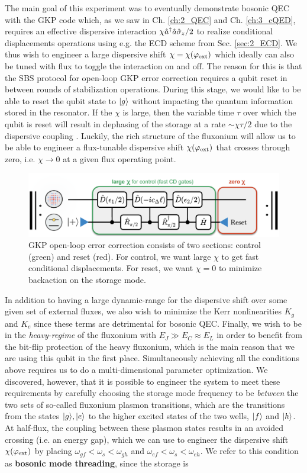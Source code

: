 The main goal of this experiment was to eventually demonstrate bosonic QEC with the GKP code which, as we saw in Ch. \ref{ch:2_QEC} and Ch. \ref{ch:3_cQED}, requires an effective dispersive interaction $\chi\hat{a}^\dagger\hat{a}\hat{\sigma}_z/2$ to realize conditional displacements operations using e.g. the ECD scheme from Sec. \ref{sec:2_ECD}. We thus wish to engineer a large dispersive shift $\chi = \chi(\varphi_{\rm ext})$ which ideally can also be tuned with flux to toggle the interaction on and off. The reason for this is that the SBS protocol for open-loop GKP error correction requires a qubit reset in between rounds of stabilization operations. During this stage, we would like to be able to reset the qubit state to $\lvert g\rangle$ without impacting the quantum information stored in the resonator. If the $\chi$ is large, then the variable time $\tau$ over which the qubit is reset will result in dephasing of the storage at a rate $\sim \chi\tau/2$ due to the dispersive coupling \cite{sivak2023gkp-expt, nordquantique2023gkp-expt}. Luckily, the rich structure of the fluxonium will allow us to be able to engineer a flux-tunable dispersive shift $\chi(\varphi_{\rm ext})$ that crosses through zero, i.e. $\chi \to 0$ at a given flux operating point. 
\begin{figure}[h]
    \centering
    \includegraphics[width=0.85\linewidth]{Figures/4/SBS_Control_and_Reset.pdf}
    \caption{GKP open-loop error correction consists of two sections: control (green) and reset (red). For control, we want large $\chi$ to get fast conditional displacements. For reset, we want $\chi = 0$ to minimize backaction on the storage mode.}
    \label{fig:4_SBS_Control_and_Reset}
\end{figure}
In addition to having a large dynamic-range for the dispersive shift over some given set of external fluxes, we also wish to minimize the Kerr nonlinearities $K_g$ and $K_e$ since these terms are detrimental for bosonic QEC. Finally, we wish to be in the \textit{heavy-regime} of the fluxonium with $E_J \gg E_C \approx E_L$ in order to benefit from the bit-flip protection of the heavy fluxonium, which is the main reason that we are using this qubit in the first place. Simultaneously achieving all the conditions above requires us to do a multi-dimensional parameter optimization. We discovered, however, that it is possible to engineer the system to meet these requirements by carefully choosing the storage mode frequency to be \textit{between} the two sets of so-called fluxonium plasmon transitions, which are the transitions from the states $\lvert g\rangle, \lvert e\rangle$ to the higher excited states of the two wells, $\lvert f\rangle$ and $\lvert h\rangle$. At half-flux, the coupling between these plasmon states results in an avoided crossing (i.e. an energy gap), which we can use to engineer the dispersive shift $\chi(\varphi_{\rm ext})$ by placing $\omega_{gf} < \omega_s < \omega_{gh}$ and $\omega_{ef} < \omega_s < \omega_{eh}$. We refer to this condition as  \textbf{bosonic mode threading}, since the storage is 
